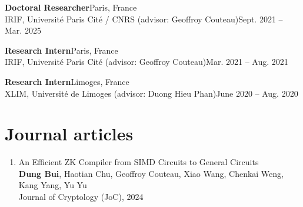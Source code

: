 \documentclass[11pt]{article}
\newcommand{\entry}[4]{%
  \noindent\textbf{#1}\hfill #2\\[0.15em]
  \noindent #3\hfill #4\par\vspace{0.45em}}
\begin{document}
\entry{Doctoral Researcher}{Paris, France}
      {IRIF, Universit\'e Paris Cit\'e / CNRS (advisor: Geoffroy Couteau)}{Sept. 2021 -- Mar. 2025}

\entry{Research Intern}{Paris, France}
      {IRIF, Universit\'e Paris Cit\'e (advisor: Geoffroy Couteau)}{Mar. 2021 -- Aug. 2021}

\entry{Research Intern}{Limoges, France}
      {XLIM, Universit\'e de Limoges (advisor: Duong Hieu Phan)}{June 2020 -- Aug. 2020}

\section{Journal articles}
\begin{enumerate}
  \item An Efficient ZK Compiler from SIMD Circuits to General Circuits\\
        \textbf{Dung Bui}, Haotian Chu, Geoffroy Couteau, Xiao Wang, Chenkai Weng, Kang Yang, Yu Yu\\
        Journal of Cryptology (JoC), 2024
\end{enumerate}

\end{document}
